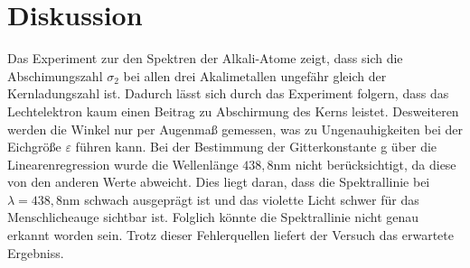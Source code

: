 \section{Diskussion}
\label{sec:Diskussion}
Das Experiment zur den Spektren der
Alkali-Atome zeigt, dass sich die Abschimungszahl
$\sigma_2$ bei allen drei Akalimetallen ungefähr gleich der
Kernladungszahl ist. Dadurch lässt sich durch das Experiment
folgern, dass das Lechtelektron kaum einen Beitrag zu Abschirmung
des Kerns leistet. Desweiteren werden die Winkel nur per Augenmaß gemessen,
was zu Ungenauhigkeiten bei der Eichgröße $\varepsilon$ führen kann. Bei der
Bestimmung der Gitterkonstante g über die Linearenregression wurde die
Wellenlänge $438,8\si{\nano\meter}$ nicht berücksichtigt, da
diese von den anderen Werte abweicht. Dies liegt daran, dass
die Spektrallinie bei $\lambda=438,8\si{\nano\meter}$
schwach ausgeprägt ist
und das violette Licht schwer für das Menschlicheauge sichtbar ist.
Folglich könnte die Spektrallinie nicht genau erkannt worden sein. Trotz
dieser Fehlerquellen liefert der Versuch das erwartete Ergebniss.
